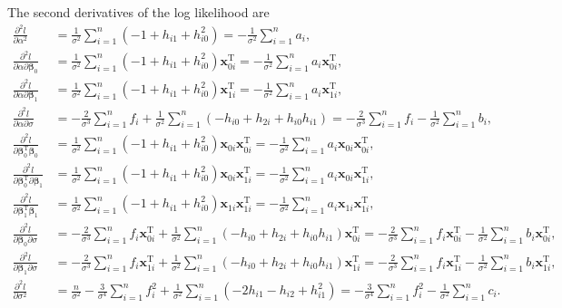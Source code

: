 \documentclass[10pt,a4paper]{article}
\def\bbeta{\bm{\beta}}
\def\bxoi{\mathbf{x}_{0i}}
\def\bxni{\mathbf{x}_{1i}}
\begin{document}
The second derivatives of the log likelihood are 
\begin{align*}
\frac{\partial^2 l}{\partial \alpha^2} 
&= \frac{1}{\sigma^2}\sum_{i=1}^n (-1 + h_{i1}+h_{i0}^2) = -\frac{1}{\sigma^2}\sum_{i=1}^n a_i,  \\
\frac{\partial^2 l}{\partial \alpha \partial \bbeta_0} 
&= \frac{1}{\sigma^2}\sum_{i=1}^n (-1 + h_{i1}+h_{i0}^2)\bxoi^{\text{T}} = -\frac{1}{\sigma^2}\sum_{i=1}^n a_i \bxoi^{\text{T}}, \\ 
\frac{\partial^2 l}{\partial \alpha \partial \bbeta_1} 
&= \frac{1}{\sigma^2}\sum_{i=1}^n (-1 + h_{i1}+h_{i0}^2)\bxni^{\text{T}}= -\frac{1}{\sigma^2}\sum_{i=1}^n a_i \bxni^{\text{T}}, \\ 
\frac{\partial^2 l}{\partial \alpha \partial \sigma} 
&= -\frac{2}{\sigma^3}\sum_{i=1}^n f_i + \frac{1}{\sigma^2}\sum_{i=1}^n (-h_{i0} + h_{2i} + h_{i0}h_{i1}) = -\frac{2}{\sigma^3}\sum_{i=1}^n f_i - \frac{1}{\sigma^2}\sum_{i=1}^n b_i, \\
\frac{\partial^2 l}{\partial \bbeta_0^{\text{T}} \bbeta_0}
&= \frac{1}{\sigma^2}\sum_{i=1}^n (-1 + h_{i1}+h_{i0}^2)\bxoi \bxoi^{\text{T}} = -\frac{1}{\sigma^2}\sum_{i=1}^n a_i \bxoi \bxoi^{\text{T}} , \\
\frac{\partial^2 l}{\partial \bbeta_0^{\text{T}} \partial \bbeta_1} 
&= \frac{1}{\sigma^2}\sum_{i=1}^n (-1 + h_{i1}+h_{i0}^2)\bxoi \bxni^{\text{T}} = -\frac{1}{\sigma^2}\sum_{i=1}^n a_i \bxoi \bxni^{\text{T}} , \\
\frac{\partial^2 l}{\partial \bbeta_1^{\text{T}} \bbeta_1} 
&= \frac{1}{\sigma^2}\sum_{i=1}^n (-1 + h_{i1}+h_{i0}^2)\bxni \bxni^{\text{T}} = -\frac{1}{\sigma^2}\sum_{i=1}^n a_i \bxni \bxni^{\text{T}} , \\
\frac{\partial^2 l}{\partial \bbeta_0 \partial \sigma} 
&= - \frac{2}{\sigma^3}\sum_{i=1}^n f_i \bxoi^{\text{T}} + \frac{1}{\sigma^2}\sum_{i=1}^n (-h_{i0} + h_{2i} + h_{i0}h_{i1})\bxoi^{\text{T}} = - \frac{2}{\sigma^3}\sum_{i=1}^n f_i \bxoi^{\text{T}} - \frac{1}{\sigma^2}\sum_{i=1}^n b_i\bxoi^{\text{T}}, \\ 
\frac{\partial^2 l}{\partial \bbeta_1 \partial \sigma} 
&= - \frac{2}{\sigma^3}\sum_{i=1}^n f_i \bxni^{\text{T}} + \frac{1}{\sigma^2}\sum_{i=1}^n (-h_{i0} + h_{2i} + h_{i0}h_{i1})\bxni^{\text{T}} = - \frac{2}{\sigma^3}\sum_{i=1}^n f_i \bxni^{\text{T}} - \frac{1}{\sigma^2}\sum_{i=1}^n b_i\bxni^{\text{T}}, \\ 
\frac{\partial^2 l}{\partial \sigma^2} 
&= \frac{n}{\sigma^2} - \frac{3}{\sigma^4}\sum_{i=1}^n f_i^2 + \frac{1}{\sigma^2}\sum_{i=1}^n (-2h_{i1} - h_{i2} + h_{i1}^2) = - \frac{3}{\sigma^4}\sum_{i=1}^n f_i^2 - \frac{1}{\sigma^2}\sum_{i=1}^n c_i .
\end{align*}
\end{document}
